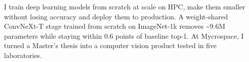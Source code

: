 

\begin{cvparagraph}
I train deep learning models from scratch at scale on HPC, make them smaller without losing accuracy and deploy them to production. A weight-shared ConvNeXt-T stage trained from scratch on ImageNet-1k removes \textasciitilde{}9.6M parameters while staying within 0.6 points of baseline top-1. At Mycrospace, I turned a Master's thesis into a computer vision product tested in five laboratories.
\end{cvparagraph}
